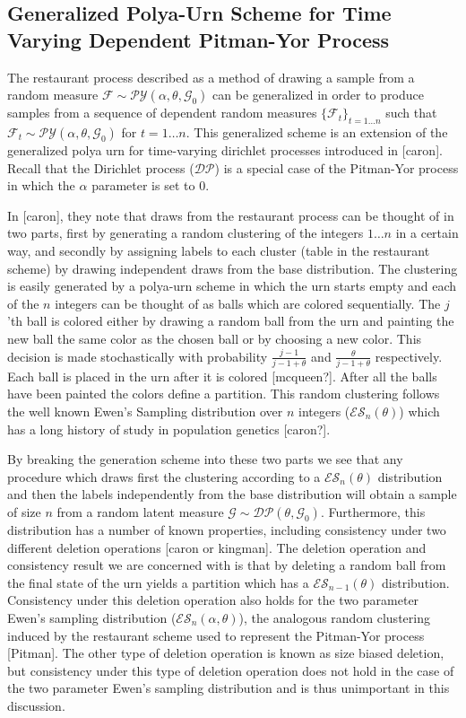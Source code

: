 \documentclass{article}
\newcommand{\F}{\mathcal{F}}
\newcommand{\PY}{\mathcal{P}\mathcal{Y}}
\newcommand{\G}{\mathcal{G}}
\newcommand{\ES}{\mathcal{E}\mathcal{S}}
\newcommand{\DP}{\mathcal{D}\mathcal{P}}
\begin{document}
\subsection{Generalized Polya-Urn Scheme for Time Varying Dependent Pitman-Yor Process} 

The restaurant process described as a method of drawing a sample from a random measure $\F \sim \PY(\alpha, \theta,\G_0)$ can be generalized in order to produce samples from a sequence of dependent random measures $\{\F_t\}_{t =1 \ldots n}$ such that $\F_t \sim \PY(\alpha, \theta,\G_0)$ for $t = 1 \dots n$.  This generalized scheme is an extension of the generalized polya urn for time-varying dirichlet processes introduced in [caron].  Recall that the Dirichlet process ($\DP$) is a special case of the Pitman-Yor process in which the $\alpha$ parameter is set to $0$. 

In [caron], they note that draws from the restaurant process can be thought of in two parts, first by generating  a random clustering of the integers $1 \dots n$ in a certain way, and secondly by assigning labels to each cluster (table in the restaurant scheme) by drawing independent draws from the base distribution.  The clustering is easily generated by a polya-urn scheme in which the urn starts empty and each of the $n$ integers can be thought of as balls which are colored sequentially.  The $j$'th ball is colored either by drawing a random ball from the urn and painting the new ball the same color as the chosen ball or by choosing a new color.  This decision is made stochastically with probability $\frac{j-1}{j - 1 +\theta}$ and $\frac{\theta}{j-1+\theta}$ respectively.  Each ball is placed in the urn after it is colored [mcqueen?]. After all the balls have been painted the colors define a partition. This random clustering follows the well known Ewen's Sampling distribution over $n$ integers ($\ES_n(\theta)$) which has a long history of study in population genetics [caron?].  

By breaking the generation scheme into these two parts we see that any procedure which draws first the clustering according to a $\ES_ n(\theta)$ distribution and then the labels independently from the base distribution will obtain a sample of size $n$ from a random latent measure $\G \sim \DP(\theta,\G_0)$.  Furthermore, this distribution has a number of known properties, including consistency under two different deletion operations [caron or kingman].  The deletion operation and consistency result we are concerned with is that by deleting a random ball from the final state of the urn yields a partition which has a $\ES_{n-1}(\theta)$ distribution.  Consistency under this deletion operation also holds for the two parameter Ewen's sampling distribution ($\ES_n(\alpha,\theta)$), the analogous random clustering induced by the restaurant scheme used to represent the Pitman-Yor process [Pitman]. The other type of deletion operation is known as size biased deletion, but consistency under this type of deletion operation does not hold in the case of the two parameter Ewen's sampling distribution and is thus unimportant in this discussion.
\end{document}
